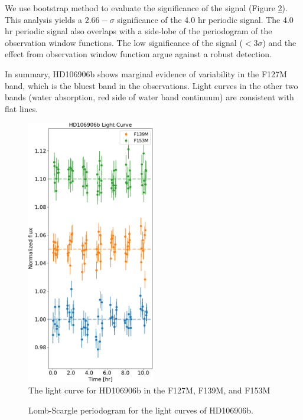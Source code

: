 \documentclass[twocolumn]{aastex62}
\begin{document}
We use bootstrap method\citep{Manjavacas2017,Zhou2019} to evaluate the significance of the signal (Figure \ref{fig:periodogram}). This analysis yields a $2.66-\sigma$ significance of the 4.0 hr periodic signal. The 4.0 hr periodic signal also overlaps with a side-lobe of the periodogram of the observation window functions. The low significance of the signal ($<3\sigma$) and the effect from observation window function argue against a robust detection.

In summary, HD106906b shows marginal evidence of variability in the F127M band, which is the bluest band in the observations. Light curves in the other two bands (water absorption, red side of water band continuum) are consistent with flat lines.

\begin{figure}
  \centering
  \includegraphics[width=0.5\textwidth]{figures/HD106906_lightcurves.pdf}
  \caption{The light curve for HD106906b in the F127M, F139M, and F153M}
  \label{fig:lightcurve}
\end{figure}

\begin{figure}
  \centering
  \caption{Lomb-Scargle periodogram for the light curves of HD106906b.}
  \label{fig:periodogram}
\end{figure}
\end{document}
